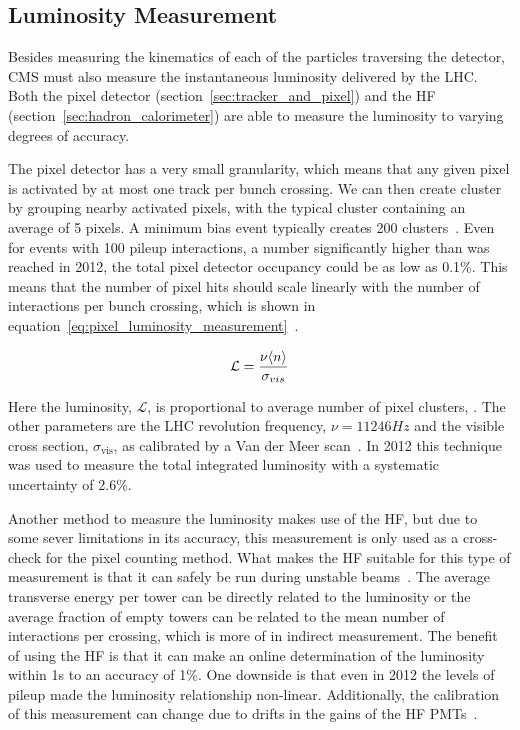\subsection{Luminosity Measurement}

Besides measuring the kinematics of each of the particles traversing the detector, CMS must also measure the instantaneous luminosity delivered by the LHC.
Both the pixel detector (section~\ref{sec:tracker_and_pixel}) and the HF (section~\ref{sec:hadron_calorimeter}) are able to measure the luminosity to varying degrees of accuracy.

The pixel detector has a very small granularity, which means that any given pixel is activated by at most one track per bunch crossing.
We can then create cluster by grouping nearby activated pixels, with the typical cluster containing an average of 5 pixels.
A minimum bias event typically creates 200 clusters~\cite{CMS-PAS-LUM-12-001}.
Even for events with 100 pileup interactions, a number significantly higher than was reached in 2012, the total pixel detector occupancy could be as low as 0.1\%.
This means that the number of pixel hits should scale linearly with the number of interactions per bunch crossing, which is shown in equation~\ref{eq:pixel_luminosity_measurement}~\cite{CMS-PAS-LUM-13-001}.

\begin{equation}
\mathcal{L}=\frac{\nu\langle n \rangle}{\sigma_{vis}}
\label{eq:pixel_luminosity_measurement}
\end{equation}

Here the luminosity, $\mathcal{L}$, is proportional to average number of pixel clusters, .
The other parameters are the LHC revolution frequency, $\nu=11246\unit{Hz}$ and the visible cross section, $\sigma_\text{vis}$, as calibrated by a Van der Meer scan~\cite{Balagura:2011yw}.
In 2012 this technique was used to measure the total integrated luminosity with a systematic uncertainty of 2.6\%.

Another method to measure the luminosity makes use of the HF, but due to some sever limitations in its accuracy, this measurement is only used as a cross-check for the pixel counting method.
What makes the HF suitable for this type of measurement is that it can safely be run during unstable beams~\cite{CMS-PAS-LUM-13-001}.
The average transverse energy per tower can be directly related to the luminosity or the average fraction of empty towers can be related to the mean number of interactions per crossing, which is more of in indirect measurement.
The benefit of using the HF is that it can make an online determination of the luminosity within 1\unit{s} to an accuracy of 1\%.
One downside is that even in 2012 the levels of pileup made the luminosity relationship non-linear.
Additionally, the calibration of this measurement can change due to drifts in the gains of the HF PMTs~\cite{Pedro2014}.